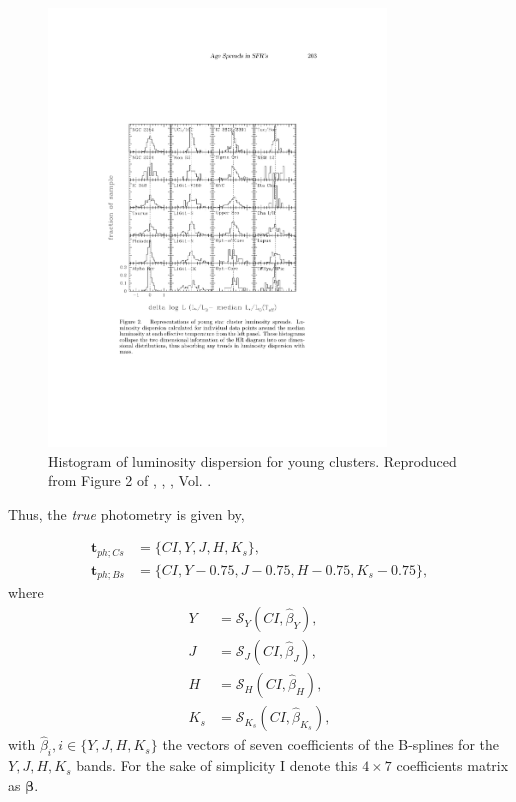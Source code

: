 \begin{figure}[ht!]
\begin{center}
\includegraphics[width=0.8\textwidth]{background/Figures/F2_Hillenbrand2008.pdf}
\caption{Histogram of luminosity dispersion for young clusters. Reproduced from Figure 2 of \citet{2008ASPC..384..200H}, \textit{}, , Vol. .}
\label{fig:luminosity_dispersion}
\end{center}
\end{figure}


Thus, the \emph{true} photometry is given by,

\begin{align}
\mathbf{t}_{ph;Cs}&= \{CI,Y,J,H,K_s\},\nonumber \\
\mathbf{t}_{ph;Bs}&=\{CI,Y-0.75,J-0.75,H-0.75,K_s-0.75\}, \nonumber
\end{align}
where
\begin{align}
Y &=\mathcal{S}_Y(CI,\hat{\beta}_Y), \nonumber \\
J &=\mathcal{S}_J(CI,\hat{\beta}_J),\nonumber \\
 H &=\mathcal{S}_H(CI,\hat{\beta}_H), \nonumber \\
 K_s &=\mathcal{S}_{K_s}(CI,\hat{\beta}_{K_s}),  \nonumber 
\end{align}
with $\hat{\beta}_{i}, i\in\{Y,J,H,K_s\}$ the vectors of seven coefficients of the B-splines for the $Y,J,H,K_s$ bands.  For the sake of simplicity I denote this $4\times7$ coefficients matrix as $\boldsymbol{\beta}$.

